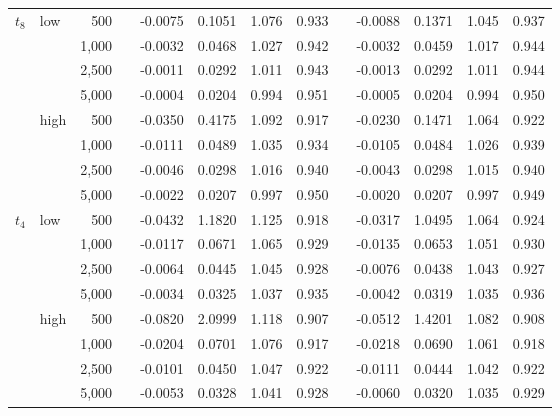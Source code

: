 \begin{table}[t]
\begin{adjustbox}{width=1\textwidth}
\begin{tabular}{llr*{9}{c}}
\addlinespace[3pt]
$t_8$ & low & 500~~ & -0.0075 & 0.1051 & 1.076 & 0.933 && -0.0088 & 0.1371 & 1.045 & 0.937\\
 &  & 1,000~~ & -0.0032 & 0.0468 & 1.027 & 0.942 && -0.0032 & 0.0459 & 1.017 & 0.944\\
 &  & 2,500~~ & -0.0011 & 0.0292 & 1.011 & 0.943 && -0.0013 & 0.0292 & 1.011 & 0.944\\
 &  & 5,000~~ & -0.0004 & 0.0204 & 0.994 & 0.951 && -0.0005 & 0.0204 & 0.994 & 0.950\\
\addlinespace[1pt]
 & high & 500~~ & -0.0350 & 0.4175 & 1.092 & 0.917 && -0.0230 & 0.1471 & 1.064 & 0.922\\
 &  & 1,000~~ & -0.0111 & 0.0489 & 1.035 & 0.934 && -0.0105 & 0.0484 & 1.026 & 0.939\\
 &  & 2,500~~ & -0.0046 & 0.0298 & 1.016 & 0.940 && -0.0043 & 0.0298 & 1.015 & 0.940\\
 &  & 5,000~~ & -0.0022 & 0.0207 & 0.997 & 0.950 && -0.0020 & 0.0207 & 0.997 & 0.949\\
\addlinespace[3pt]
$t_4$ & low & 500~~ & -0.0432 & 1.1820 & 1.125 & 0.918 && -0.0317 & 1.0495 & 1.064 & 0.924\\
 &  & 1,000~~ & -0.0117 & 0.0671 & 1.065 & 0.929 && -0.0135 & 0.0653 & 1.051 & 0.930\\
 &  & 2,500~~ & -0.0064 & 0.0445 & 1.045 & 0.928 && -0.0076 & 0.0438 & 1.043 & 0.927\\
 &  & 5,000~~ & -0.0034 & 0.0325 & 1.037 & 0.935 && -0.0042 & 0.0319 & 1.035 & 0.936\\
\addlinespace[1pt]
 & high & 500~~ & -0.0820 & 2.0999 & 1.118 & 0.907 && -0.0512 & 1.4201 & 1.082 & 0.908\\
 &  & 1,000~~ & -0.0204 & 0.0701 & 1.076 & 0.917 && -0.0218 & 0.0690 & 1.061 & 0.918\\
 &  & 2,500~~ & -0.0101 & 0.0450 & 1.047 & 0.922 && -0.0111 & 0.0444 & 1.042 & 0.922\\
 &  & 5,000~~ & -0.0053 & 0.0328 & 1.041 & 0.928 && -0.0060 & 0.0320 & 1.035 & 0.929\\
\bottomrule
\end{tabular}
\end{adjustbox}\end{table}
